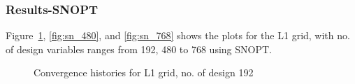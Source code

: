 \subsubsection{Results-SNOPT}
Figure~\ref{fig:sn_192}, \ref{fig:sn_480}, and \ref{fig:sn_768} shows the plots for the L1 grid, with no. of 
design variables ranges from 192, 480 to 768 using SNOPT. 

\begin{figure}[H]
  \centering
   \caption{Convergence histories for L1 grid, no. of design 192 \label{fig:sn_192}}
\end{figure}

